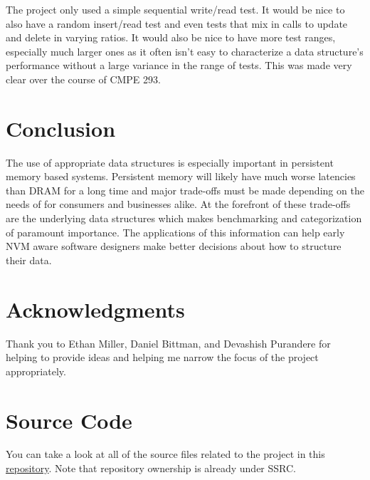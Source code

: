 \documentclass[twocolumn]{article}
\begin{document}
The project only used a simple sequential write/read test. It would be nice to
also have a random insert/read test and even tests that mix in calls to update
and delete in varying ratios. It would also be nice to have more test ranges,
especially much larger ones as it often isn't easy to characterize a data
structure's performance without a large variance in the range of tests. This was
made very clear over the course of CMPE 293.

\section{Conclusion}

The use of appropriate data structures is especially important in persistent
memory based systems. Persistent memory will likely have much worse latencies
than DRAM for a long time and major trade-offs must be made depending on the
needs of for consumers and businesses alike. At the forefront of these
trade-offs are the underlying data structures which makes benchmarking and
categorization of paramount importance. The applications of this information can
help early NVM aware software designers make better decisions about how to
structure their data.

\section{Acknowledgments}

Thank you to Ethan Miller, Daniel Bittman, and Devashish Purandere for helping
to provide ideas and helping me narrow the focus of the project appropriately.

\section{Source Code}

You can take a look at all of the source files related to the project in this
\href{https://bitbucket.org/ssrc/nvm_persistent_structures}{repository}. Note
that repository ownership is already under SSRC.



\end{document}
